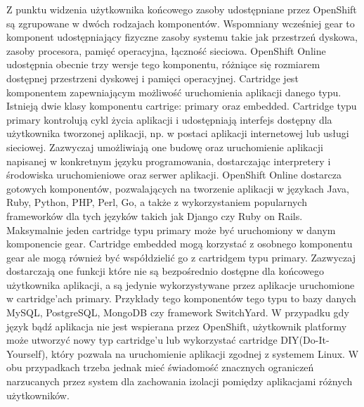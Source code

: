 Z punktu widzenia użytkownika końcowego zasoby udostępniane przez OpenShift są zgrupowane w dwóch rodzajach komponentów.
Wspomniany wcześniej gear to komponent udostępniający fizyczne zasoby systemu takie jak przestrzeń dyskowa, zasoby procesora, pamięć operacyjna, łączność sieciowa. OpenShift Online udostępnia obecnie trzy wersje tego komponentu, różniące się rozmiarem dostępnej przestrzeni dyskowej i pamięci operacyjnej.
Cartridge jest komponentem zapewniającym możliwość uruchomienia aplikacji danego typu. Istnieją dwie klasy komponentu cartrige: primary oraz embedded. 
Cartridge typu primary kontrolują cykl życia aplikacji i udostępniają interfejs dostępny dla użytkownika tworzonej aplikacji, np. w postaci aplikacji internetowej lub usługi sieciowej. Zazwyczaj umożliwiają one budowę oraz uruchomienie aplikacji napisanej w konkretnym języku programowania, dostarczając interpretery i środowiska uruchomieniowe oraz serwer aplikacji. OpenShift Online dostarcza gotowych komponentów, pozwalających na tworzenie aplikacji w językach Java, Ruby, Python, PHP, Perl, Go, a także z wykorzystaniem popularnych frameworków dla tych języków takich jak Django czy Ruby on Rails. Maksymalnie jeden cartridge typu primary może być uruchomiony w danym komponencie gear. 
Cartridge embedded mogą korzystać z osobnego komponentu gear ale mogą również być współdzielić go z cartridgem typu primary. Zazwyczaj dostarczają one funkcji które nie są bezpośrednio dostępne dla końcowego użytkownika aplikacji, a są jedynie wykorzystywane przez aplikacje uruchomione w cartridge’ach primary. Przykłady tego komponentów tego typu to bazy danych MySQL, PostgreSQL, MongoDB czy framework SwitchYard.
W przypadku gdy język bądź aplikacja nie jest wspierana przez OpenShift, użytkownik platformy może utworzyć nowy typ cartridge’u lub wykorzystać cartridge DIY(Do-It-Yourself), który pozwala na uruchomienie aplikacji zgodnej z systemem Linux. W obu przypadkach trzeba jednak mieć świadomość znacznych ograniczeń narzucanych przez system dla zachowania izolacji pomiędzy aplikacjami różnych użytkowników.


